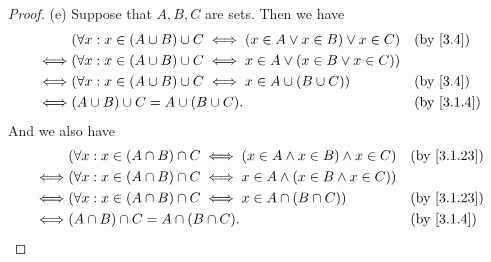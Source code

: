 \begin{proof}{(e)}
  Suppose that \(A, B, C\) are sets.
  Then we have
  \begin{align*}
         & (\forall x : x \in (A \cup B) \cup C \iff (x \in A \lor x \in B) \lor x \in C) &  & \text{(by \cref{3.4})}   \\
    \iff & (\forall x : x \in (A \cup B) \cup C \iff x \in A \lor (x \in B \lor x \in C))                               \\
    \iff & (\forall x : x \in (A \cup B) \cup C \iff x \in A \cup (B \cup C))             &  & \text{(by \cref{3.4})}   \\
    \iff & (A \cup B) \cup C = A \cup (B \cup C).                                         &  & \text{(by \cref{3.1.4})}
  \end{align*}
  And we also have
  \begin{align*}
         & (\forall x : x \in (A \cap B) \cap C \iff (x \in A \land x \in B) \land x \in C) &  & \text{(by \cref{3.1.23})} \\
    \iff & (\forall x : x \in (A \cap B) \cap C \iff x \in A \land (x \in B \land x \in C))                                \\
    \iff & (\forall x : x \in (A \cap B) \cap C \iff x \in A \cap (B \cap C))               &  & \text{(by \cref{3.1.23})} \\
    \iff & (A \cap B) \cap C = A \cap (B \cap C).                                           &  & \text{(by \cref{3.1.4})}
  \end{align*}
\end{proof}


